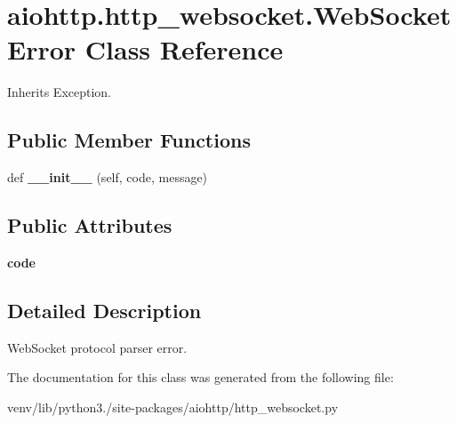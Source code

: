 \hypertarget{classaiohttp_1_1http__websocket_1_1_web_socket_error}{}\section{aiohttp.\+http\+\_\+websocket.\+Web\+Socket\+Error Class Reference}
\label{classaiohttp_1_1http__websocket_1_1_web_socket_error}


Inherits Exception.

\subsection*{Public Member Functions}
\begin{DoxyCompactItemize}
\item 
\mbox{\label{classaiohttp_1_1http__websocket_1_1_web_socket_error_a7ffe4b0c46679b2557862e1607799be5}} 
def {\bfseries \+\_\+\+\_\+init\+\_\+\+\_\+} (self, code, message)
\end{DoxyCompactItemize}
\subsection*{Public Attributes}
\begin{DoxyCompactItemize}
\item 
\mbox{\label{classaiohttp_1_1http__websocket_1_1_web_socket_error_a08b26b4be74e6181e4c11733426f3b9d}} 
{\bfseries code}
\end{DoxyCompactItemize}


\subsection{Detailed Description}
\begin{DoxyVerb}WebSocket protocol parser error.\end{DoxyVerb}
 

The documentation for this class was generated from the following file\+:\begin{DoxyCompactItemize}
\item 
venv/lib/python3./site-\/packages/aiohttp/http\+\_\+websocket.\+py\end{DoxyCompactItemize}

